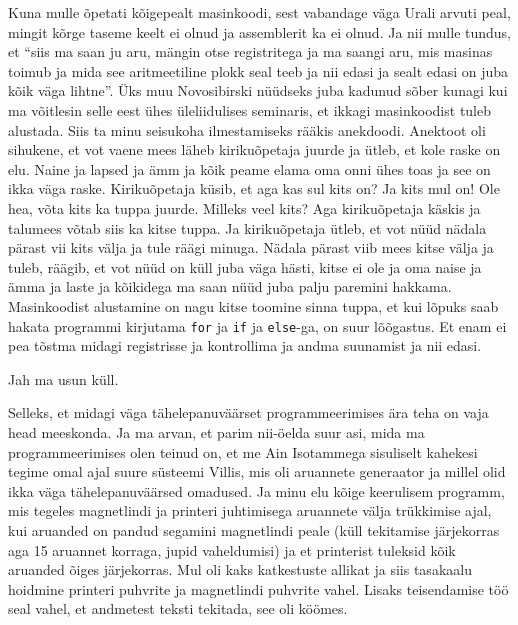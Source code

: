 Kuna mulle õpetati kõigepealt masinkoodi, sest vabandage väga Urali arvuti peal, mingit  kõrge taseme keelt ei olnud ja assemblerit ka ei olnud. Ja nii mulle tundus, et \enquote{siis ma saan ju aru, mängin otse registritega ja ma saangi aru, mis masinas toimub ja mida see aritmeetiline plokk seal teeb ja nii edasi ja sealt edasi on juba kõik väga lihtne}. Üks muu Novosibirski nüüdseks juba kadunud sõber kunagi kui ma võitlesin selle eest ühes üleliidulises seminaris, et ikkagi masinkoodist tuleb alustada. Siis ta minu seisukoha ilmestamiseks rääkis anekdoodi. Anektoot oli sihukene, et vot vaene mees läheb kirikuõpetaja juurde ja ütleb, et kole raske on elu. Naine ja lapsed ja ämm ja kõik peame elama oma onni ühes toas ja see on ikka väga raske. Kirikuõpetaja küsib, et aga kas sul kits on? Ja kits mul on! Ole hea, võta kits ka tuppa juurde. Milleks veel kits? Aga kirikuõpetaja käskis ja talumees võtab siis ka kitse tuppa. Ja kirikuõpetaja ütleb, et vot nüüd nädala pärast vii kits välja ja tule räägi minuga. Nädala pärast viib mees kitse välja ja tuleb, räägib, et vot nüüd on küll juba väga hästi, kitse ei ole ja oma naise ja ämma ja laste ja kõikidega ma saan nüüd juba palju paremini hakkama. Masinkoodist alustamine on nagu kitse toomine sinna tuppa, et kui lõpuks saab hakata programmi kirjutama \verb|for| ja \verb|if| ja \verb|else|-ga, on suur lõõgastus. Et enam ei pea tõstma midagi registrisse ja kontrollima ja andma suunamist ja nii edasi. 



Jah ma usun küll. 

Selleks, et midagi väga tähelepanuväärset programmeerimises ära teha on vaja head meeskonda. Ja ma arvan, et parim nii-öelda suur asi, mida ma programmeerimises olen teinud on, et me Ain Isotammega sisuliselt kahekesi tegime omal ajal suure süsteemi Villis, mis oli aruannete generaator ja millel olid ikka väga tähelepanuväärsed omadused. Ja minu elu kõige keerulisem programm, mis tegeles magnetlindi ja printeri juhtimisega aruannete välja trükkimise ajal, kui aruanded on pandud segamini magnetlindi peale (küll tekitamise järjekorras aga 15 aruannet korraga, jupid vaheldumisi) ja et  printerist tuleksid kõik aruanded õiges järjekorras. Mul oli kaks katkestuste allikat ja siis tasakaalu hoidmine printeri puhvrite ja magnetlindi puhvrite vahel. Lisaks teisendamise töö seal vahel, et andmetest teksti tekitada, see oli köömes. 

